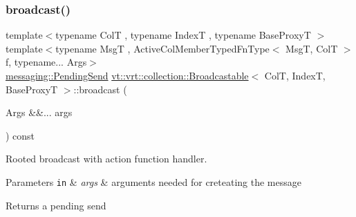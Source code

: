 \mbox{\label{structvt_1_1vrt_1_1collection_1_1_broadcastable_a96cd21a1be6313144a8c4aa3683eaa05}} 
\subsubsection{\texorpdfstring{broadcast()}{broadcast()}\hspace{0.1cm}{\footnotesize\ttfamily [3/7]}}
{\footnotesize\ttfamily template$<$typename ColT , typename IndexT , typename Base\+ProxyT $>$ \\
template$<$typename MsgT , Active\+Col\+Member\+Typed\+Fn\+Type$<$ Msg\+T, Col\+T $>$ f, typename... Args$>$ \\
\hyperlink{structvt_1_1messaging_1_1_pending_send}{messaging\+::\+Pending\+Send} \hyperlink{structvt_1_1vrt_1_1collection_1_1_broadcastable}{vt\+::vrt\+::collection\+::\+Broadcastable}$<$ ColT, IndexT, Base\+ProxyT $>$\+::broadcast (\begin{DoxyParamCaption}\item[{Args \&\&...}]{args }\end{DoxyParamCaption}) const}



Rooted broadcast with action function handler. 


\begin{DoxyParams}[1]{Parameters}
\mbox{\tt in}  & {\em args} & arguments needed for creteating the message\\
\hline
\end{DoxyParams}
\begin{DoxyReturn}{Returns}
a pending send 
\end{DoxyReturn}
\mbox{\label{structvt_1_1vrt_1_1collection_1_1_broadcastable_a0a08e1ab7c78e36b3ecb5b6a4d399dab}} 
